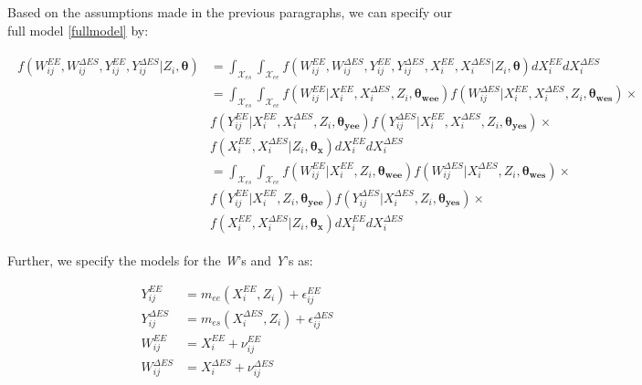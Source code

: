 \documentclass[11pt]{article}\usepackage[]{graphicx}\usepackage[]{color}
\begin{document}
Based on the assumptions made in the previous paragraphs, we can specify our full model \eqref{fullmodel} by:

\begin{align}
  \begin{split}
    \label{truedist}
  f({ W_{ij}^{EE},W_{ij}^{\Delta ES}, Y_{ij}^{EE},Y_{ij}^{\Delta ES}|Z_i},\boldsymbol{\theta}) &= \int_{\mathcal{X}_{es}} \int_{\mathcal{X}_{ee}} f({ W_{ij}^{EE},W_{ij}^{\Delta ES}, Y_{ij}^{EE},Y_{ij}^{\Delta ES}, X_i^{EE}, X_i^{\Delta ES}|Z_i},\boldsymbol{\theta}) d{ X_i^{EE}} d{ X_i^{\Delta ES}} \\
    &= \int_{\mathcal{X}_{es}} \int_{\mathcal{X}_{ee}} f({ W_{ij}^{EE}|X_i^{EE},X_i^{\Delta ES},Z_i},\boldsymbol{\theta_{wee}}) f({ W_{ij}^{\Delta ES}|X_i^{EE},X_i^{\Delta ES},Z_i},\boldsymbol{\theta_{wes}}) \times\\
  & f({ Y_{ij}^{EE}|X_i^{EE},X_i^{\Delta ES},Z_i},\boldsymbol{\theta_{yee}}) f({ Y_{ij}^{\Delta ES}|X_i^{EE},X_i^{\Delta ES},Z_i},\boldsymbol{\theta_{yes}}) \times  \\
  & f({ X_i^{EE}, X_i^{\Delta ES}|Z_i},\boldsymbol{\theta_x}) d{ X_i^{EE}} d{ X_i^{\Delta ES}} \\
  &= \int_{\mathcal{X}_{es}} \int_{\mathcal{X}_{ee}} f({ W_{ij}^{EE}|X_i^{EE},Z_i},\boldsymbol{\theta_{wee}}) f({ W_{ij}^{\Delta ES}|X_i^{\Delta ES},Z_i},\boldsymbol{\theta_{wes}}) \times\\
  & f({ Y_{ij}^{EE}|X_i^{EE},Z_i},\boldsymbol{\theta_{yee}}) f({ Y_{ij}^{\Delta ES}|X_i^{\Delta ES},Z_i},\boldsymbol{\theta_{yes}}) \times  \\
  & f({ X_i^{EE}, X_i^{\Delta ES}|Z_i},\boldsymbol{\theta_x}) d{ X_i^{EE}} d{ X_i^{\Delta ES}} 
  \end{split}
\end{align}

Further, we specify the models for the \emph{W}'s and \emph{Y}'s as:

\begin{align}
  \label{regressionfcn1} 
  Y_{ij}^{EE} &= m_{ee}(X_i^{EE} ,Z_i) + \epsilon_{ij}^{EE}  \\
  \label{regressionfcn2}
  Y_{ij}^{\Delta ES} &= m_{es}(X_i^{\Delta ES} ,Z_i) + \epsilon_{ij}^{\Delta ES} \\
  \label{gold1} 
  W_{ij}^{EE} &= X_i^{EE}  + \nu_{ij}^{EE}  \\
  \label{gold2}
  W_{ij}^{\Delta ES} &= X_i^{\Delta ES}  + \nu_{ij}^{\Delta ES} 
\end{align}
\end{document}
